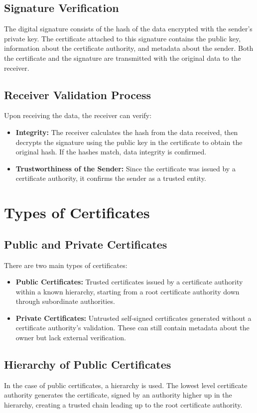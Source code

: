 \documentclass{article}
\begin{document}
\subsection{Signature Verification}
The digital signature consists of the hash of the data encrypted with the sender's private key. The certificate attached to this signature contains the public key, information about the certificate authority, and metadata about the sender. Both the certificate and the signature are transmitted with the original data to the receiver.

\subsection{Receiver Validation Process}
Upon receiving the data, the receiver can verify:
\begin{itemize}
    \item \textbf{Integrity:} The receiver calculates the hash from the data received, then decrypts the signature using the public key in the certificate to obtain the original hash. If the hashes match, data integrity is confirmed.
    \item \textbf{Trustworthiness of the Sender:} Since the certificate was issued by a certificate authority, it confirms the sender as a trusted entity.
\end{itemize}

\section{Types of Certificates}
\subsection{Public and Private Certificates}
There are two main types of certificates:
\begin{itemize}
    \item \textbf{Public Certificates:} Trusted certificates issued by a certificate authority within a known hierarchy, starting from a root certificate authority down through subordinate authorities.
    \item \textbf{Private Certificates:} Untrusted self-signed certificates generated without a certificate authority's validation. These can still contain metadata about the owner but lack external verification.
\end{itemize}

\subsection{Hierarchy of Public Certificates}
In the case of public certificates, a hierarchy is used. The lowest level certificate authority generates the certificate, signed by an authority higher up in the hierarchy, creating a trusted chain leading up to the root certificate authority.
\end{document}
